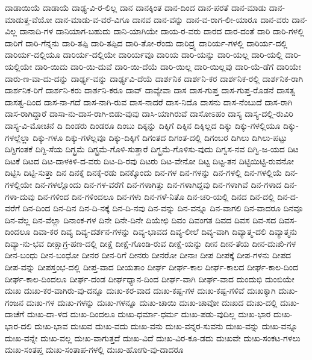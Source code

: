 {ದಾಡಾಯಿಯೆ
ದಾಡಾಯೆ
ದಾಢ್ಯ-ವಿ-ರ-ಲಿಲ್ಲ
ದಾನ
ದಾನಕ್ಕಿಂತ
ದಾನ-ದಿಂದ
ದಾನ-ಪರತೆ
ದಾನ-ಮಾಡು
ದಾನ-ಮಾಡುತ್ತ-ವೆಯೋ
ದಾನ-ಮಾಡು-ವ-ವರೆ-ವಿಗೂ
ದಾನವ
ದಾನ-ವನ್ನು
ದಾನ-ವ-ರಾಗ-ಲೀ-ಯಾರೂ
ದಾನ-ವರು
ದಾನ-ವಿಲ್ಲ
ದಾನಾದಿ-ಗಳ
ದಾನಿಯಾಗ-ಬಹುದು
ದಾನಿ-ಯಾಗಿಯೇ
ದಾಯ-ರ-ವರು
ದಾರದ
ದಾರ-ದಂತೆ
ದಾರಿ
ದಾರಿ-ಗಳಲ್ಲಿ
ದಾರಿಗೆ
ದಾರಿ-ಗೆನ್ನನು
ದಾರಿ-ತಪ್ಪಿ
ದಾರಿ-ತಪ್ಪಿದ
ದಾರಿ-ತೋ-ರೆಂದು
ದಾರಿದ್ರ್ಯ
ದಾರಿರ್ಯ-ಗಳಲ್ಲಿ
ದಾರಿರ್ಯ-ದಲ್ಲಿ
ದಾರಿರ್ಯ-ದಲ್ಲಿಯೂ
ದಾರಿರ್ಯ-ದಲ್ಲಿಯೇ
ದಾರಿರ್ಯವೂ
ದಾರಿಯ
ದಾರಿ-ಯನ್ನು
ದಾರಿ-ಯಲ್ಲ
ದಾರಿ-ಯಲ್ಲಿ
ದಾರಿ-ಯಲ್ಲಿಯೇ
ದಾರಿ-ಯಿದು
ದಾರಿ-ಯಿ-ದುವೆ
ದಾರಿ-ಯಿ-ದೆಯೆ
ದಾರಿ-ಯಿಲ್ಲ
ದಾರಿ-ಯಿಲ್ಲವು
ದಾರಿ-ಯೆ-ಡೆಗೆ
ದಾರಿಯೇ
ದಾರು-ಣ-ವಾ-ದು-ದನ್ನು
ದಾರ್ಢ್ಯ-ವನ್ನು
ದಾರ್ಢ್ಯವಿ-ದೆಯೆ
ದಾರ್ಶನಿಕ
ದಾರ್ಶನಿ-ಕರ
ದಾರ್ಶನಿಕ-ರಲ್ಲಿ
ದಾರ್ಶನಿಕ-ರಾಗಿ
ದಾರ್ಶನಿಕ-ರಿಗೆ
ದಾರ್ಶನಿ-ಕರು
ದಾರ್ಶನಿ-ಕರೂ
ದಾವ್
ದಾವ್ಯೇವಾ
ದಾಸ
ದಾಸ-ಗುಪ್ತ
ದಾಸ-ಗುಪ್ತ-ರೊಡನೆ
ದಾಸತ್ವ
ದಾಸತ್ವ-ದಿಂದ
ದಾಸ-ನಾ-ಗದೆ
ದಾಸ-ನಾಗಿ-ರುವ
ದಾಸ-ನಾದರೆ
ದಾಸ-ನಿದೊ
ದಾಸನು
ದಾಸ-ನೆಂಬುದೆ
ದಾಸ-ರಾಗಿ
ದಾಸ-ರಾಗಿದ್ದಾರೆ
ದಾಸಾ-ನು-ದಾಸ-ರಾಗಿ-ಬಿಡು-ವುವು
ದಾಸಿ-ಯಾಗಿರುವೆ
ದಾಸೋಽಹಂ
ದಾಸ್ಯ
ದಾಸ್ಯ-ದಲ್ಲಿ-ರುವಿರಿ
ದಾಸ್ಯ-ವಿ-ಮೋಚನೆ
ದಿ
ದಿಂಡರು
ದಿಂಡರೂ
ದಿಂಬು
ದಿಕ್ಕನ್ನು
ದಿಕ್ಕಿಗೆ
ದಿಕ್ಕಿನ
ದಿಕ್ಕಿಲ್ಲದ
ದಿಕ್ಕು
ದಿಕ್ಕು-ಗಳಲ್ಲಿಯೂ
ದಿಕ್ಕು-ಗಳಲ್ಲೆಲ್ಲಾ
ದಿಕ್ಕು-ಗಳೂ
ದಿಕ್ಕು-ಗಳೆಲ್ಲವೂ
ದಿಕ್ಕು-ದಿಕ್ಕಿಗೆ
ದಿಗಂತದ
ದಿಗಂತ-ದಲ್ಲಿ
ದಿಗಂಬರ
ದಿಗಿಲು
ದಿಗಿಲು-ಪಟ್ಟು
ದಿಗ್ದಿಗಂತಕೆ
ದಿಗ್ದಿ-ಸೆಯ
ದಿಗ್ಭ್ರಮೆ
ದಿಗ್ಭ್ರಮೆ-ಗೊಳಿ-ಸುತ್ತಾರೆ
ದಿಗ್ಭ್ರಮೆ-ಗೊಳಿಸು-ವುದು
ದಿಗ್ವಸ-ನವ
ದಿಗ್ವಿ-ಜ-ಯದ
ದಿಟ
ದಿಟಕೆ
ದಿಟದ
ದಿಟ-ದಾಳಕಿಳಿ-ದ-ವರು
ದಿಟ-ದಿ-ರವು
ದಿಟರು
ದಿಟ-ವೇನೋ
ದಿಟ್ಟ
ದಿಟ್ಟ-ತನ
ದಿಟ್ಟಿಯಿಟ್ಟಿ-ರುವನೋ
ದಿಟ್ಟಿಸಿ
ದಿಟ್ಟಿ-ಸುತ್ತಾ
ದಿನ
ದಿನಕ್ಕೆ
ದಿನಕ್ಕೆ-ರಡು
ದಿನಕ್ಕೊಂದು
ದಿನ-ಗಳ
ದಿನ-ಗಳನ್ನು
ದಿನ-ಗಳಲ್ಲಿ
ದಿನ-ಗಳಲ್ಲಿಯೆ
ದಿನ-ಗಳಲ್ಲಿಯೇ
ದಿನ-ಗಳಲ್ಲೊಂದು
ದಿನ-ಗಳ-ವರೆಗೆ
ದಿನ-ಗಳಾಗಿತ್ತು
ದಿನ-ಗಳಾಗಿದ್ದವು
ದಿನ-ಗಳಾಗಿವೆ
ದಿನ-ಗಳಾದ
ದಿನ-ಗಳಾ-ದುವು
ದಿನ-ಗಳಿಂದ
ದಿನ-ಗಳಿಂದಲೂ
ದಿನ-ಗಳು
ದಿನ-ಗಳೆ-ನಿತೊ
ದಿನ-ಚರಿ-ಯಲ್ಲಿ
ದಿನದ
ದಿನ-ದಲ್ಲಿ
ದಿನ-ದ-ವರೆಗೆ
ದಿನ-ದಿಂದ
ದಿನ-ದಿನ
ದಿನ-ದಿ-ನಕ್ಕೆ
ದಿನ-ದಿ-ನವು
ದಿನ-ವನ್ನು
ದಿನ-ವನ್ನೂ
ದಿನ-ವಾಗಲಿ
ದಿನ-ವಾದರೂ
ದಿನವೂ
ದಿನ-ವೆಲ್ಲ
ದಿನ-ವೆಲ್ಲಾ
ದಿನಾಂಕ-ಗಳ
ದಿನೇ
ದಿನೇ-ದಿನೇ
ದಿಯೇಛಿ
ದಿವಂ
ದಿವಂಗತ
ದಿವದ
ದಿವಸ
ದಿವ-ಸದ
ದಿವಸ-ದಿಂದಲೂ
ದಿವಾ-ಕರ
ದಿವ್ಯ
ದಿವ್ಯ-ದರ್ಶನ-ಗಳನ್ನು
ದಿವ್ಯ-ಭಾವದ
ದಿವ್ಯ-ಲೀಲೆ
ದಿವ್ಯ-ವಾಗಿ
ದಿವ್ಯಾತ್ಮ-ದಲಿ
ದಿವ್ಯಾತ್ಮನು
ದಿವ್ಯಾ-ನು-ಭವ
ದೀಕ್ಷಾಗ್ರ-ಹಣ-ದಲ್ಲಿ
ದೀಕ್ಷೆ
ದೀಕ್ಷೆ-ಗೊಂಡಿ-ರುವ
ದೀಕ್ಷೆ-ಯನ್ನು
ದೀನ
ದೀನ-ತೆಯ
ದೀನ-ದುಃಖಿ-ಗಳ
ದೀನ-ಬಂಧು
ದೀನ-ಬಂಧೋ
ದೀನರ
ದೀನ-ರಿಗೆ
ದೀನರು
ದೀನರೋ
ದೀನಾಃ
ದೀಪ
ದೀಪಕ್ಕೆ
ದೀಪ-ಗಳನು
ದೀಪದ
ದೀಪ-ವನ್ನು
ದೀಪಸ್ತಂಭ-ದಲ್ಲಿ
ದೀಪ್ತ-ವಾದ
ದೀಯತಾಂ
ದೀರ್ಘ
ದೀರ್ಘ-ಕಾಲ
ದೀರ್ಘ-ಕಾಲದ
ದೀರ್ಘ-ಕಾಲ-ದಿಂದ
ದೀರ್ಘ-ಕಾಲ-ದಿಂದಲೂ
ದೀರ್ಘ-ದಂಡ
ದೀರ್ಘಧ್ಯಾನ-ದಿಂದ
ದೀರ್ಘ-ವಾಗಿ
ದೀರ್ಘ-ವಾದ
ದುಂದುಭಿ
ದುಂಬಿಯೇ
ದುಃಖ
ದುಃಖ-ಕರ-ವಾಗಿರು-ವು-ದನ್ನೂ
ದುಃಖ-ಕರ-ವಾದ
ದುಃಖ-ಕಷ್ಟ-ಗಳ
ದುಃಖ-ಕಷ್ಟ-ಗಳಿವೆ
ದುಃಖಕ್ಕಾಗಿ
ದುಃಖ-ಗಂಜನ
ದುಃಖ-ಗಳ
ದುಃಖ-ಗಳನ್ನು
ದುಃಖ-ಗಳನ್ನೂ
ದುಃಖ-ಚಾಯಿ
ದುಃಖ-ಚಾವೋ
ದುಃಖದ
ದುಃಖ-ದಲ್ಲಿ
ದುಃಖ-ದಾಚೆಗೆ
ದುಃಖ-ದಾ-ಳದ
ದುಃಖ-ದಿಂದಲೂ
ದುಃಖ-ಧರ್ಮಾ-ಧರ್ಮ
ದುಃಖ-ಪಡು-ವುದಿಲ್ಲ
ದುಃಖ-ಭಾರ
ದುಃಖ-ಭಾರ-ದಲಿ
ದುಃಖ-ಭಾವ
ದುಃಖವ
ದುಃಖ-ವದು
ದುಃಖ-ವನು
ದುಃಖ-ವನ್ನರ-ಸುವನು
ದುಃಖ-ವನ್ನು
ದುಃಖ-ವನ್ನೂ
ದುಃಖ-ವನ್ನೇ
ದುಃಖ-ವಲ್ಲ
ದುಃಖ-ವಾಗುತ್ತದೆ
ದುಃಖ-ವಿದೆ
ದುಃಖ-ವಿರ-ಕೂ-ಡದು
ದುಃಖವೇ
ದುಃಖ-ಸಂಕಟ-ಗಳಲು
ದುಃಖ-ಸಂತಪ್ತ
ದುಃಖ-ಸಂತಾಪ-ಗಳಲ್ಲಿ
ದುಃಖ-ಹೋಗು-ವು-ದಾದರೂ
}
